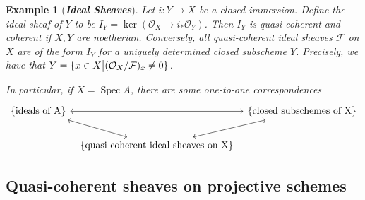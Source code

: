 \documentclass{ctexart}
\newtheorem{example}{Example}[section]
\newcommand{\spec}{\operatorname{Spec}}
\begin{document}
\begin{example}[\textbf{\emph{Ideal Sheaves}}]
    Let $i: Y \longrightarrow X$ be a closed immersion.
    Define the ideal sheaf of $Y$ to be $I_{Y} = \ker(\mathcal{O}_{X} \longrightarrow i_{\ast}\mathcal{O}_{Y})$.
    Then $I_{Y}$ is quasi-coherent and coherent if $X,Y$ are noetherian.
    Conversely, all quasi-coherent ideal sheaves $\mathcal{F}$ on $X$ are of the form $I_{Y}$ for a uniquely determined closed subscheme $Y$.
    Precisely, we have that $Y = \{x\in X \big{|} (\mathcal{O}_{X}/\mathcal{F})_{x} \neq 0\}$.
    \par
    In particular, if $X = \spec A$, there are some one-to-one correspondences
    \begin{equation*}
        \begin{tikzcd}[column sep= tiny]
            \{\text{ideals of A}\} \arrow[rr, leftrightarrow] \arrow[dr, leftrightarrow] &&
            \{\text{closed subschemes of X}\} \\
            & \{\text{quasi-coherent ideal sheaves on X}\} \arrow[ur, leftrightarrow] &
        \end{tikzcd}
    \end{equation*}
\end{example}

\subsection{Quasi-coherent sheaves on projective schemes}
\label{subsection:Sheaves_of_Modules_Quasi-coherent_sheaves_on_projective_schemes}
\end{document}
